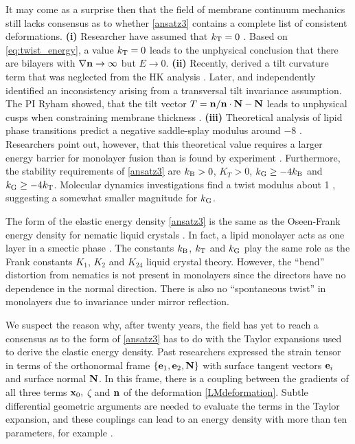  It may come as a surprise then that the field of membrane continuum mechanics still lacks consensus as to
 whether \eqref{ansatz3} contains a complete list of consistent deformations.
\textbf{(i)} Researcher have assumed that $k_{\mathrm{T}} = 0$ \cite{Hamm2000, TerziDeserno17, C9SM02079A, PhysRevE.102.042406}.
  Based on \eqref{eq:twist_energy}, a value $k_{\mathrm{T}} = 0$ leads to the
  unphysical conclusion that there are bilayers with $\nabla {\bf n} \to \infty$ but $E \to 0.$ 
  \textbf{(ii)}
  Recently, \cite{TerziDeserno17} derived a tilt curvature term that was neglected from the HK analysis \cite{Hamm2000}.
  Later, \cite{C9SM02079A} 
  and \cite{PhysRevE.102.042406} independently identified an inconsistency \cite{TerziDeserno17} arising
  from a transversal tilt invariance assumption.
  The PI Ryham showed,  that the tilt vector $T = {\bf n}/{\bf n}\cdot {\bf N} - {\bf N}$ leads to unphysical cusps when constraining membrane thickness  \cite{RyKlYaCo16}.  
  \textbf{(iii)}
  Theoretical analysis of lipid phase transitions predict a negative saddle-splay modulus around $-8$ \kBT\;
\cite{SIEGEL2004366,SIEGEL20085200}. Researchers point out, however, that this theoretical value requires a larger energy 
barrier for monolayer fusion than is found by experiment \cite{FrRoPi17,Tran7106,TerziDeserno17}.
Furthermore, the stability requirements of \eqref{ansatz3} are $k_{\mathrm{B}} > 0$, $K_T > 0$, $k_{\mathrm{G}} \geq -4k_{\mathrm{B}}$
and $k_{\mathrm{G}} \geq -4k_{\mathrm{T}}$. Molecular dynamics investigations find a twist modulus about 1 \kBT \cite{LeVeWa14},
suggesting a somewhat smaller magnitude for $k_{\mathrm{G}}$.

 
The form of the elastic energy density \eqref{ansatz3} is the same as
the Oseen-Frank energy density for nematic liquid crystals \cite{ANDRIENKO2018520,Tran7106,Helfrich73}.   In fact,  
a lipid monolayer acts as one layer in a smectic  phase \cite{REYESMATEO1995978,Rangamani20140463,PhysRevLett.113.248102}. 
The constants $k_{\mathrm{B}}$, $k_{\mathrm{T}}$  and $k_{\mathrm{G}}$ play the same role as the Frank constants $K_1$, $K_2$ and $K_{24}$
liquid crystal theory. However, the ``bend'' distortion from nematics  
is not present in monolayers since the directors have no dependence in the normal direction.
There is also no ``spontaneous twist'' in monolayers due to invariance under mirror reflection. 
  
  We suspect the reason why, after twenty years, the field has yet to reach a consensus 
  as to the form of \eqref{ansatz3} has to do with the Taylor expansions used to derive the elastic energy density. 
  Past researchers expressed the strain tensor in
  terms of the orthonormal frame $\{{\bf e}_1, {\bf e}_2, {\bf N}\}$ with surface tangent vectors ${\bf e}_i$ and surface normal ${\bf N}$.  
  In this frame, there is a coupling between the gradients of all three terms ${\bf x}_0,$ $\zeta$ and ${\bf n}$ of the deformation \eqref{LMdeformation}.
  Subtle differential geometric arguments are needed to evaluate the terms in the Taylor expansion,
  and these couplings can lead to an energy density with more than ten parameters, for example \cite{PhysRevE.102.042406}.

